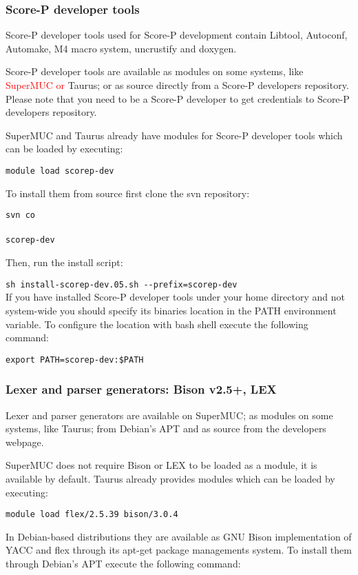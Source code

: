 \subsubsection{Score-P developer tools}
Score-P developer tools used for Score-P development contain Libtool, Autoconf,
Automake, M4 macro system, uncrustify and doxygen.

Score-P developer tools are available as modules on some systems, like \textcolor{red}{SuperMUC or }
Taurus; or as source directly from a Score-P developers repository. Please note
that you need to be a Score-P developer to get credentials to Score-P
developers repository.

SuperMUC and Taurus already have modules for Score-P developer tools which can
be loaded by executing:

\texttt{module load scorep-dev}

To install them from source first clone the svn repository:

\texttt{svn co\\
\scorepdevurl\\
 scorep-dev}

Then, run the install script:

\texttt{sh install-scorep-dev.05.sh -{}-prefix=\installloc scorep-dev} \\

If you have installed Score-P developer tools under your home directory and not
system-wide you should specify its binaries location in the PATH environment
variable. To configure the location with bash shell execute the following
command:

\texttt{export PATH=\installloc scorep-dev:\$PATH}

\subsubsection{Lexer and parser generators: Bison v2.5+, LEX}
Lexer and parser generators are available on SuperMUC; as modules on some
systems, like Taurus; from Debian's APT and as source from the developers
webpage.

SuperMUC does not require Bison or LEX to be loaded as a module, it is
available by default.
Taurus already provides modules which can be loaded by executing:

\texttt{module load flex/2.5.39 bison/3.0.4}

In Debian-based distributions they are available as GNU Bison implementation of
YACC and flex through its apt-get package managements system. To install them
through Debian's APT execute the following command:

